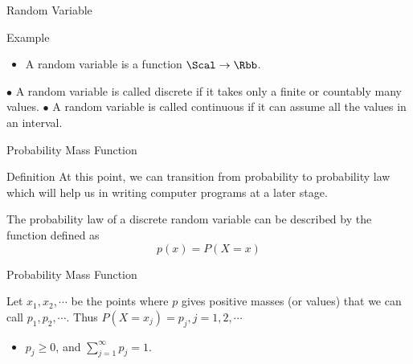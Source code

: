 \documentclass[aspectratio=169,xcolor=dvipsnames,svgnames,x11names,fleqn]{beamer}
\begin{document}
\begin{frame}[containsverbatim]{Random Variable}
    \begin{tblock}{Example}

        {\color{blue}{For example, the probability that a random variable takes the value of 2 would be expressed as $P(X = 2)$ where $x = 2$.}}
    
        
        \begin{itemize}
            \item[-] A random variable is a function $\Scal \to \Rbb$.
        \end{itemize}
    
    $\bullet$ A random variable is called discrete if it takes only a finite or countably many values.\newline
    $\bullet$ A random variable is called continuous if it can assume all the values in an interval.
    \end{tblock}
    
\end{frame}

\begin{frame}[containsverbatim]{Probability Mass Function}
    
    \begin{gradblock}{Definition}
        At this point, we can transition from probability to probability law which will help us in writing computer programs at a later stage.
    
        The probability law of a discrete random variable can be described by the function defined as 
        \begin{equation}
            p(x) = P(X = x)
        \end{equation}
    \end{gradblock}

\end{frame}

\begin{frame}[containsverbatim]{Probability Mass Function}
    
    
    Let $x_1, x_2, \cdots $ be the points where $p$ gives positive masses (or values) that we can call $p_1, p_2, \cdots$. Thus $P(X = x_j) = p_j, j = 1, 2, \cdots $
    \begin{itemize}
        \item $p_j \geq 0$, and $\sum_{j= 1}^\infty p_j = 1$.
    \end{itemize}

\end{frame}
\end{document}
